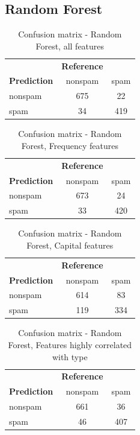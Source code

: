 \documentclass{article}\usepackage[]{graphicx}\usepackage[]{xcolor}
\begin{document}
\subsection*{Random Forest}
\begin{table}[h]
    \centering
    \begin{tabular}{lcc}
        & \textbf{Reference} & \\
        \textbf{Prediction} & nonspam & spam \\
        nonspam & 675 & 22 \\
        spam & 34 & 419 \\
    \end{tabular}
    \caption{Confusion matrix - Random Forest, all features}
    \label{RFcm1}
\end{table}
\begin{table}[h]
    \centering
    \begin{tabular}{lcc}
        & \textbf{Reference} & \\
        \textbf{Prediction} & nonspam & spam \\
        nonspam & 673 & 24 \\
        spam & 33 & 420 \\
    \end{tabular}
    \caption{Confusion matrix - Random Forest, Frequency features}
    \label{RFcm2}
\end{table}
\begin{table}[h]
    \centering
    \begin{tabular}{lcc}
        & \textbf{Reference} & \\
        \textbf{Prediction} & nonspam & spam \\
        nonspam & 614 & 83 \\
        spam & 119 & 334 \\
    \end{tabular}
    \caption{Confusion matrix - Random Forest, Capital features}
    \label{RFcm3}
\end{table}
\begin{table}[h]
    \centering
    \begin{tabular}{lcc}
        & \textbf{Reference} & \\
        \textbf{Prediction} & nonspam & spam \\
        nonspam & 661 & 36 \\
        spam & 46 & 407 \\
    \end{tabular}
    \caption{Confusion matrix - Random Forest, Features highly correlated with type}
    \label{RFcm4}
\end{table}
\end{document}
